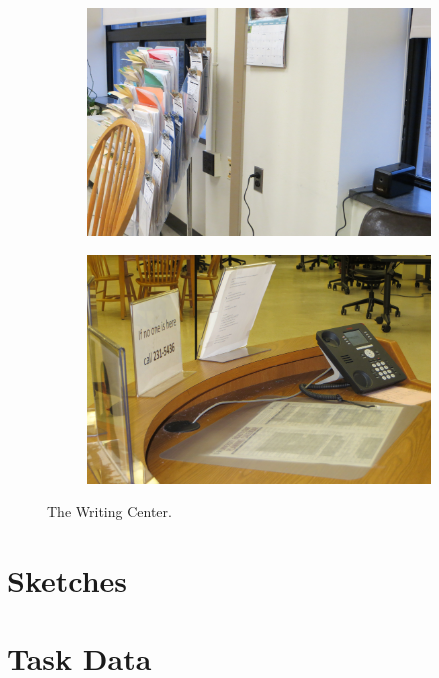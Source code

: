 \documentclass[12pt]{article} %
\begin{document}
\begin{samepage}
\begin{figure}[H]
\begin{subfigure}{.5\linewidth}
  \caption{}
  \label{fig:WC6}
  \end{subfigure}\\[1ex]
  \begin{subfigure}{.5\linewidth}
  \centering
  \includegraphics[width=0.75\linewidth]{WC7}
  \caption{}
  \label{fig:WC7}
  \end{subfigure}%
  \begin{subfigure}{.5\linewidth}
  \centering
  \includegraphics[width=0.75\linewidth]{WC8}
  \caption{}
  \label{fig:WC8}
  \end{subfigure}
  \caption{The Writing Center.}
  \label{fig:TheWritingCenter}
  \end{figure}
\end{samepage}

\section{Sketches} %

\section{Task Data} %
\end{document}
